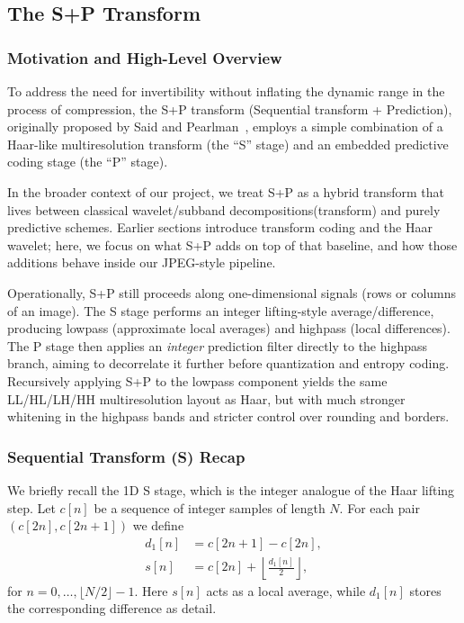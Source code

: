 \subsection{The S+P Transform}

\subsubsection{Motivation and High-Level Overview}

To address the need for invertibility without inflating the dynamic range in the process of compression, the S+P transform (Sequential transform + Prediction), originally proposed by Said and Pearlman~\cite{said1993sp}, employs a simple combination of a Haar-like multiresolution transform (the ``S'' stage) and an embedded predictive coding stage (the ``P'' stage).

In the broader context of our project, we treat S+P as a hybrid transform that lives between classical wavelet/subband decompositions(transform) and purely predictive schemes. Earlier sections introduce transform coding and the Haar wavelet; here, we focus on what S+P adds on top of that baseline, and how those additions behave inside our JPEG-style pipeline.

Operationally, S+P still proceeds along one-dimensional signals (rows or columns of an image). The S stage performs an integer lifting-style average/difference, producing lowpass (approximate local averages) and highpass (local differences). The P stage then applies an \emph{integer} prediction filter directly to the highpass branch, aiming to decorrelate it further before quantization and entropy coding. Recursively applying S+P to the lowpass component yields the same LL/HL/LH/HH multiresolution layout as Haar, but with much stronger whitening in the highpass bands and stricter control over rounding and borders.

\subsubsection{Sequential Transform (S) Recap}

We briefly recall the 1D S stage, which is the integer analogue of the Haar lifting step. Let $c[n]$ be a sequence of integer samples of length $N$. For each pair $(c[2n], c[2n+1])$ we define
\begin{align}
    d_1[n] &= c[2n+1] - c[2n], \\
    s[n]   &= c[2n] + \left\lfloor \frac{d_1[n]}{2} \right\rfloor,
\end{align}
for $n = 0, \dots, \lfloor N/2 \rfloor - 1$. Here $s[n]$ acts as a local average, while $d_1[n]$ stores the corresponding difference as detail.

